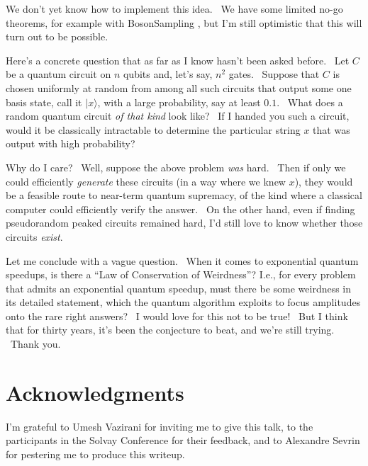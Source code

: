 \documentclass[11pt]{article}
\begin{document}
\noindent We don't yet know how to implement this idea. \ We have some limited no-go theorems, for example with BosonSampling \cite{anguyen,berkowitzdevlin}, but I'm still optimistic that this will turn out to be possible.

Here's a concrete question that as far as I know hasn't been asked before. \ Let $C$ be a quantum circuit on $n$ qubits and, let's say, $n^2$ gates. \ Suppose that $C$ is chosen uniformly at random from among all such circuits that output some one basis state, call it $|x\rangle$, with a large probability, say at least $0.1$. \ What does a random quantum circuit \emph{of that kind} look like? \ If I handed you such a circuit, would it be classically intractable to determine the particular string $x$ that was output with high probability?

Why do I care? \ Well, suppose the above problem \emph{was} hard. \ Then if only we could efficiently \emph{generate} these circuits (in a way where we knew $x$), they would be a feasible route to near-term quantum supremacy, of the kind where a classical computer could efficiently verify the answer. \ On the other hand, even if finding pseudorandom peaked circuits remained hard, I'd still love to know whether those circuits \emph{exist}.

Let me conclude with a vague question. \ When it comes to exponential quantum speedups, is there a ``Law of Conservation of Weirdness''?  I.e., for every problem that admits an exponential quantum speedup, must there be some weirdness in its detailed statement, which the quantum algorithm exploits to focus amplitudes onto the rare right answers? \ I would love for this not to be true! \ But I think that for thirty years, it's been the conjecture to beat, and we're still trying. \ Thank you.

\section{Acknowledgments}

I'm grateful to Umesh Vazirani for inviting me to give this talk, to the participants in the Solvay Conference for their feedback, and to Alexandre Sevrin for pestering me to produce this writeup.



\end{document}
